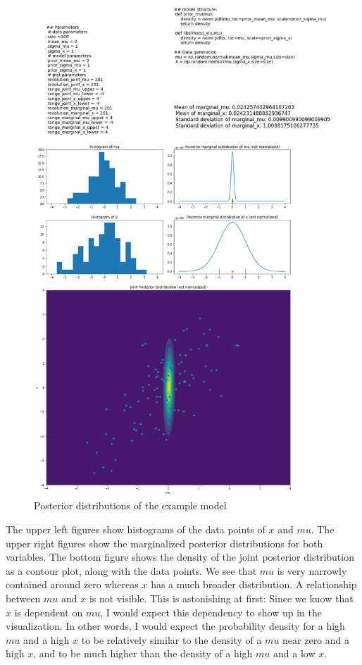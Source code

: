 \documentclass{article}
\begin{document}
\begin{figure}
	\includegraphics[width=\textwidth]{images/ground_truth_posterior_1.png}
	\caption[Posterior distributions of the example model]{Posterior distributions of the example model}
	\label{fig:ground_truth_posterior_1}
\end{figure}
The upper left figures show histograms of the data points of $x$ and $mu$. The upper right figures show the marginalized posterior distributions for both variables. The bottom figure shows the density of the joint posterior distribution as a contour plot, along with the data points. We see that $mu$ is very narrowly contained around zero whereas $x$ has a much broader distribution. A relationship between $mu$ and $x$ is not visible. This is astonishing at first: Since we know that $x$ is dependent on $mu$, I would expect this dependency to show up in the visualization. In other words, I would expect the probability density for a high $mu$ and a high $x$ to be relatively similar to the density of a $mu$ near zero and a high $x$, and to be much higher than the density of a high $mu$ and a low $x$.
\end{document}

